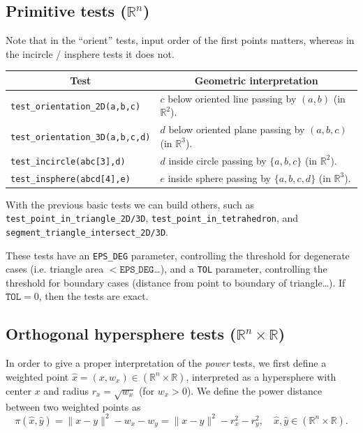 \documentclass[12pt]{article}
\theoremstyle{definition}
\theoremstyle{remark}
\begin{document}
\subsection{Primitive tests ($\mathbb{R}^n$)}
Note that in the ``orient'' tests, input order of the first points matters, whereas in the incircle / insphere tests it does not. 
\begin{table}[h]
\begin{tabular}{|l|l|}
\hline
\multicolumn{1}{|c|}{\textbf{Test}} &  
\multicolumn{1}{c|}{\textbf{Geometric interpretation}}\\
\hline\hline
\texttt{test\_orientation\_2D(a,b,c)} &  $c$ below oriented line passing by $(a,b)$ (in $\mathbb{R}^2$). \\
\hline
\texttt{test\_orientation\_3D(a,b,c,d)} & $d$ below oriented plane passing by $(a,b,c)$ (in $\mathbb{R}^3$). \\
\hline\hline
\texttt{test\_incircle(abc[3],d)} & $d$ inside circle passing by $\{a,b,c\}$ (in $\mathbb{R}^2$). \\
\hline
\texttt{test\_insphere(abcd[4],e)} & $e$ inside sphere passing by $\{a,b,c,d\}$ (in $\mathbb{R}^3$).\\
\hline
\end{tabular}
\end{table}


With the previous basic tests we can build others, such as
\texttt{test\_point\_in\_triangle\_2D/3D}, \texttt{test\_point\_in\_tetrahedron},
and \texttt{segment\_triangle\_intersect\_2D/3D}.

\noindent
These tests have an \texttt{EPS\_DEG} parameter, controlling the threshold for degenerate cases (i.e. triangle area $< \mathtt{EPS\_DEG}$\dots), and a \texttt{TOL} parameter, controlling the threshold for boundary cases (distance from point to boundary of triangle\dots). If $\mathtt{TOL}= 0$, then the tests are exact.
%


\subsection{Orthogonal hypersphere tests ($\mathbb{R}^n \times \mathbb{R}$)}


In order to give a proper interpretation of the \textit{power} tests, we first define a weighted point $\hat x = (x, w_x)\in (\mathbb{R}^n \!\times\! \mathbb{R})$, interpreted as a hypersphere with center $x$ and radius $r_x = \sqrt{w_x}$ (for $w_x > 0$). We define the power distance between two weighted points as
\begin{equation*}
    \pi(\hat x, \hat y) = \| x - y\|^2 - w_x - w_y = \| x - y\|^2 - r_x^2 - r_y^2, \quad \hat x, \hat y \in (\mathbb{R}^n \!\times\! \mathbb{R}).
\end{equation*}
\end{document}
